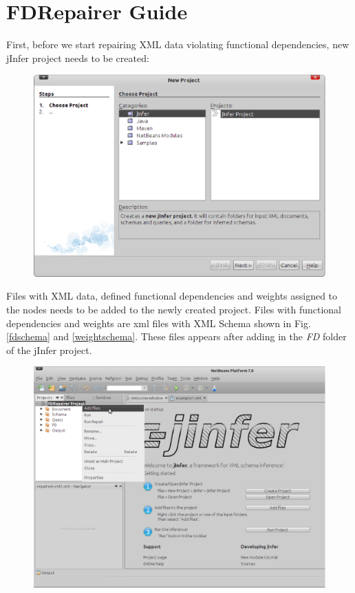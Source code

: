 \chapter{FDRepairer Guide}

First, before we start repairing XML data violating functional dependencies, new jInfer project needs to be created:

\begin{figure}[H]
    \centering\includegraphics[width=\textwidth]{tutorial_images/new_project}
\end{figure}

Files with XML data, defined functional dependencies and weights assigned to the nodes needs to be added to the newly created project. Files with functional dependencies and weights are xml files with XML Schema shown in Fig. \ref{fdschema} and \ref{weightschema}. These files appears after adding in the \emph{FD} folder of the jInfer project.

\begin{figure}[H]
    \centering\includegraphics[width=\textwidth]{tutorial_images/add_files}
\end{figure}

